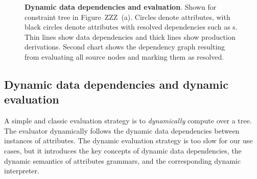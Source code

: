 \begin{figure}
\caption{\textbf{Dynamic data dependencies and evaluation}. Shown for constraint tree  in Figure~ZZZ~(a). Circles denote attributes, with black circles denote attributes with resolved dependencies such as s. Thin lines show data dependencies and thick lines show production derivations. Second chart shows the dependency graph resulting from evaluating all source nodes and marking them as resolved.}
\label{fig:deps}
\end{figure}


\subsection{Dynamic data dependencies and dynamic evaluation}
A simple and classic evaluation strategy is to \emph{dynamically} compute over a tree. The evaluator dynamically follows the dynamic data dependencies between instances of attributes. The dynamic evaluation strategy is too slow for our use cases, but it introduces the key concepts of dynamic data dependencies, the dynamic semantics of attributes grammars, and the corresponding dynamic interpreter.

